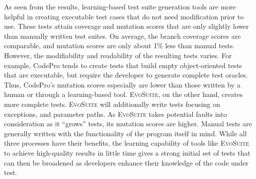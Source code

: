 As seen from the results, learning-based test suite generation tools are more helpful in creating executable test cases that do not need modification prior to use.  These tests attain coverage and mutation scores that are only slightly lower than manually written test suites.  On average, the branch coverage scores are comparable, and mutation scores are only about 1\% less than manual tests.  However, the modifiability and readability of the resulting tests varies.  For example, CodePro tends to create tests that build empty object-oriented tests that are executable, but require the developer to generate complete test oracles.  Thus, CodePro's mutation scores especially are lower than those written by a human or through a learning-based tool.  \textsc{EvoSuite}, on the other hand, creates more complete tests.  \textsc{EvoSuite} will additionally write tests focusing on exceptions, and parameter paths.  As \textsc{EvoSuite} takes potential faults into consideration as it ``grows'' tests, its mutation scores are higher.  Manual tests are generally written with the functionality of the program itself in mind.  While all three processes have their benefits, the learning capability of tools like \textsc{EvoSuite} to achieve high-quality results in little time gives a strong initial set of tests that can then be broadened as developers enhance their knowledge of the code under test.

